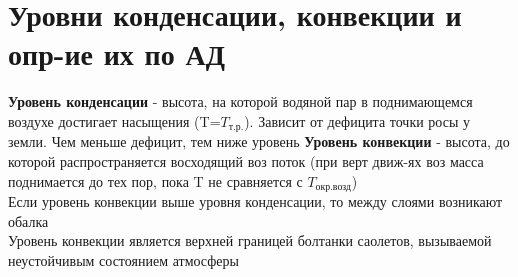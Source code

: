 
\section{Уровни конденсации, конвекции и опр-ие их по АД}
\textbf{Уровень конденсации} - высота, на которой водяной пар в поднимающемся воздухе достигает насыщения (T=$T_\text{т.р.}$). Зависит от дефицита точки росы у земли. Чем меньше дефицит, тем ниже уровень
\textbf{Уровень конвекции} - высота, до которой распространяется восходящий воз поток (при верт движ-ях воз масса поднимается до тех пор, пока T не сравняется с $T_\text{окр.возд}$)\\
Если уровень конвекции выше уровня конденсации, то между слоями возникают обалка\\
Уровень конвекции является верхней границей болтанки саолетов, вызываемой неустойчивым состоянием атмосферы